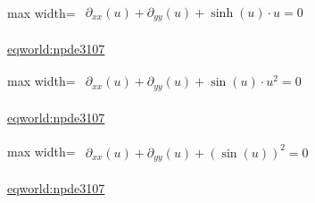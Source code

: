 \documentclass[10pt,a4paper]{article}
\begin{document}
\begin{minipage}{\linewidth}
\begin{center}\begin{adjustbox}{max width=\linewidth}$\displaystyle\begin{gathered}\begin{gathered}\partial_{xx}(u)+\partial_{yy}(u)+\sinh(u)\cdot u=0\end{gathered}\end{gathered}$\end{adjustbox}\end{center}
{\small \href{https://eqworld.ipmnet.ru/en/solutions/npde/npde3107.pdf}{eqworld:npde3107}}\par
\end{minipage}\par\vspace{7mm}

\begin{minipage}{\linewidth}
\begin{center}\begin{adjustbox}{max width=\linewidth}$\displaystyle\begin{gathered}\begin{gathered}\partial_{xx}(u)+\partial_{yy}(u)+\sin(u)\cdot u^{2}=0\end{gathered}\end{gathered}$\end{adjustbox}\end{center}
{\small \href{https://eqworld.ipmnet.ru/en/solutions/npde/npde3107.pdf}{eqworld:npde3107}}\par
\end{minipage}\par\vspace{7mm}

\begin{minipage}{\linewidth}
\begin{center}\begin{adjustbox}{max width=\linewidth}$\displaystyle\begin{gathered}\begin{gathered}\partial_{xx}(u)+\partial_{yy}(u)+(\sin(u))^{2}=0\end{gathered}\end{gathered}$\end{adjustbox}\end{center}
{\small \href{https://eqworld.ipmnet.ru/en/solutions/npde/npde3107.pdf}{eqworld:npde3107}}\par
\end{minipage}\par\vspace{7mm}
\end{document}
